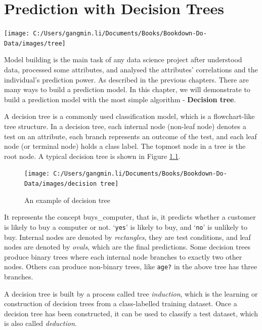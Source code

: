 \documentclass[
]{book}
\begin{document}
\hypertarget{prediction-with-decision-trees}{%
\chapter{Prediction with Decision Trees}\label{prediction-with-decision-trees}}

\begin{center}\texttt{[image: C:/Users/gangmin.li/Documents/Books/Bookdown-Do-Data/images/tree]} \end{center}

Model building is the main task of any data science project after understood data, processed some attributes, and analysed the attributes' correlations and the individual's prediction power. As described in the previous chapters. There are many ways to build a prediction model. In this chapter, we will demonstrate to build a prediction model with the most simple algorithm - \textbf{Decision tree}.

A decision tree is a commonly used classification model, which is a flowchart-like tree structure. In a decision tree, each internal node (non-leaf node) denotes a test on an attribute, each branch represents an outcome of the test, and each leaf node (or terminal node) holds a class label. The topmost node in a tree is the root node. A typical decision tree is shown in Figure \ref{fig:decisiontree}.

\begin{figure}

{\centering \texttt{[image: C:/Users/gangmin.li/Documents/Books/Bookdown-Do-Data/images/decision tree]} 

}

\caption{An example of decision tree}\label{fig:decisiontree}
\end{figure}

It represents the concept buys\_computer, that is, it predicts whether a customer is likely to buy a computer or not. `\texttt{yes}' is likely to buy, and `\texttt{no}' is unlikely to buy. Internal nodes are denoted by \emph{rectangles}, they are test conditions, and leaf nodes are denoted by \emph{ovals}, which are the final predictions. Some decision trees produce binary trees where each internal node branches to exactly two other nodes. Others can produce non-binary trees, like \texttt{age?} in the above tree has three branches.

A decision tree is built by a process called tree \emph{induction}, which is the learning or construction of decision trees from a class-labelled training dataset. Once a decision tree has been constructed, it can be used to classify a test dataset, which is also called \emph{deduction}.
\end{document}
